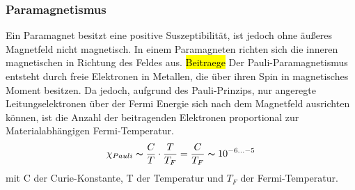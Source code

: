         \subsubsection*{Paramagnetismus}
            Ein Paramagnet besitzt eine positive Suszeptibilität, ist jedoch ohne äußeres 
            Magnetfeld nicht magnetisch. In einem Paramagneten richten sich die inneren magnetischen 
            in Richtung des Feldes aus.
            \hl{Beitraege}
            Der Pauli-Paramagnetismus entsteht durch freie Elektronen in Metallen, die über ihren Spin 
            in magnetisches Moment besitzen. Da jedoch, aufgrund des Pauli-Prinzips, nur angeregte
            Leitungselektronen über der Fermi Energie sich nach dem Magnetfeld ausrichten können, 
            ist die Anzahl der beitragenden Elektronen proportional zur Materialabhängigen Fermi-Temperatur.
            \begin{equation}
                \chi_{Pauli} \thicksim \frac{C}{T} \cdot \frac{T}{T_{F}} = \frac{C}{T_F}\thicksim 10^{-6 ... -5}
            \end{equation}
            mit C der Curie-Konstante, T der Temperatur und $T_F$ der Fermi-Temperatur.
            
